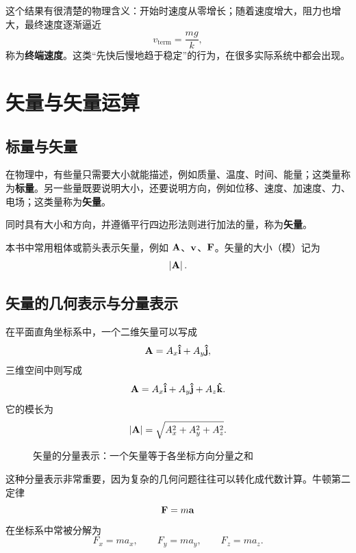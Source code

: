 这个结果有很清楚的物理含义：开始时速度从零增长；随着速度增大，阻力也增大，最终速度逐渐逼近
\[
  v_{\text{term}} = \frac{mg}{k},
\]
称为\textbf{终端速度}。这类“先快后慢地趋于稳定”的行为，在很多实际系统中都会出现。

\section{矢量与矢量运算}

\subsection{标量与矢量}

在物理中，有些量只需要大小就能描述，例如质量、温度、时间、能量；这类量称为\textbf{标量}。另一些量既要说明大小，还要说明方向，例如位移、速度、加速度、力、电场；这类量称为\textbf{矢量}。

\begin{definition}
同时具有大小和方向，并遵循平行四边形法则进行加法的量，称为\textbf{矢量}。
\end{definition}

本书中常用粗体或箭头表示矢量，例如 $\vb{A}$、$\vb{v}$、$\vb{F}$。矢量的大小（模）记为
\[
  \left|\vb{A}\right|.
\]

\subsection{矢量的几何表示与分量表示}

在平面直角坐标系中，一个二维矢量可以写成
\[
  \vb{A}=A_x\vu{i}+A_y\vu{j},
\]
三维空间中则写成
\[
  \vb{A}=A_x\vu{i}+A_y\vu{j}+A_z\vu{k}.
\]
它的模长为
\[
  \left|\vb{A}\right| = \sqrt{A_x^2 + A_y^2 + A_z^2}.
\]

\begin{figure}[H]
  \centering
  \caption{矢量的分量表示：一个矢量等于各坐标方向分量之和}
\end{figure}

这种分量表示非常重要，因为复杂的几何问题往往可以转化成代数计算。牛顿第二定律
\[
  \vb{F}=m\vb{a}
\]
在坐标系中常被分解为
\[
  F_x=ma_x, \qquad F_y=ma_y, \qquad F_z=ma_z.
\]

